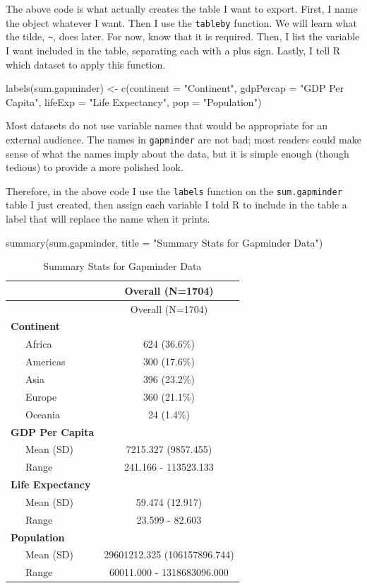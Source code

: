 \documentclass[
]{book}
\makeatletter
\newenvironment{Shaded}{\begin{snugshade}}{\end{snugshade}}
\newcommand{\AttributeTok}[1]{\textcolor[rgb]{0.61,0.61,0.61}{#1}}
\newcommand{\FunctionTok}[1]{\textcolor[rgb]{0,0,0}{#1}}
\newcommand{\NormalTok}[1]{#1}
\newcommand{\OtherTok}[1]{\textcolor[rgb]{0.37,0.37,0.37}{#1}}
\newcommand{\StringTok}[1]{\textcolor[rgb]{0.5,0.5,0.5}{#1}}
\newenvironment{kframe}{%
\medskip{}
\setlength{\fboxsep}{.8em}
 \def\at@end@of@kframe{}%
 \ifinner\ifhmode%
  \def\at@end@of@kframe{\end{minipage}}%
  \begin{minipage}{\columnwidth}%
 \fi\fi%
 \def\FrameCommand##1{\hskip\@totalleftmargin \hskip-\fboxsep
 \colorbox{shadecolor}{##1}\hskip-\fboxsep
     \hskip-\linewidth \hskip-\@totalleftmargin \hskip\columnwidth}%
 \MakeFramed {\advance\hsize-\width
   \@totalleftmargin\z@ \linewidth\hsize
   \@setminipage}}%
 {\par\unskip\endMakeFramed%
 \at@end@of@kframe}
\renewenvironment{Shaded}{\begin{kframe}}{\end{kframe}}
\makeatother
\begin{document}
The above code is what actually creates the table I want to export. First, I name the object whatever I want. Then I use the \texttt{tableby} function. We will learn what the tilde, \texttt{\textasciitilde{}}, does later. For now, know that it is required. Then, I list the variable I want included in the table, separating each with a plus sign. Lastly, I tell R which dataset to apply this function.

\begin{Shaded}
\begin{Highlighting}[]
\FunctionTok{labels}\NormalTok{(sum.gapminder) }\OtherTok{\textless{}{-}} \FunctionTok{c}\NormalTok{(}\AttributeTok{continent =} \StringTok{"Continent"}\NormalTok{, }\AttributeTok{gdpPercap =} \StringTok{"GDP Per Capita"}\NormalTok{, }\AttributeTok{lifeExp =} \StringTok{"Life Expectancy"}\NormalTok{, }\AttributeTok{pop =} \StringTok{"Population"}\NormalTok{)}
\end{Highlighting}
\end{Shaded}

Most datasets do not use variable names that would be appropriate for an external audience. The names in \texttt{gapminder} are not bad; most readers could make sense of what the names imply about the data, but it is simple enough (though tedious) to provide a more polished look.

Therefore, in the above code I use the \texttt{labels} function on the \texttt{sum.gapminder} table I just created, then assign each variable I told R to include in the table a label that will replace the name when it prints.

\begin{Shaded}
\begin{Highlighting}[]
\FunctionTok{summary}\NormalTok{(sum.gapminder, }\AttributeTok{title =} \StringTok{"Summary Stats for Gapminder Data"}\NormalTok{)}
\end{Highlighting}
\end{Shaded}

\begin{longtable}[]{@{}lc@{}}
\caption{Summary Stats for Gapminder Data}\tabularnewline
\toprule
& Overall (N=1704)\tabularnewline
\midrule
\endfirsthead
\toprule
& Overall (N=1704)\tabularnewline
\midrule
\endhead
\textbf{Continent} &\tabularnewline
~~~Africa & 624 (36.6\%)\tabularnewline
~~~Americas & 300 (17.6\%)\tabularnewline
~~~Asia & 396 (23.2\%)\tabularnewline
~~~Europe & 360 (21.1\%)\tabularnewline
~~~Oceania & 24 (1.4\%)\tabularnewline
\textbf{GDP Per Capita} &\tabularnewline
~~~Mean (SD) & 7215.327 (9857.455)\tabularnewline
~~~Range & 241.166 - 113523.133\tabularnewline
\textbf{Life Expectancy} &\tabularnewline
~~~Mean (SD) & 59.474 (12.917)\tabularnewline
~~~Range & 23.599 - 82.603\tabularnewline
\textbf{Population} &\tabularnewline
~~~Mean (SD) & 29601212.325 (106157896.744)\tabularnewline
~~~Range & 60011.000 - 1318683096.000\tabularnewline
\bottomrule
\end{longtable}
\end{document}
